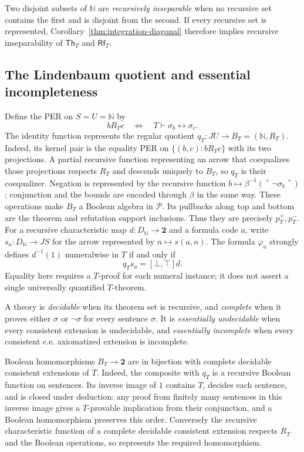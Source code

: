 \documentclass[11pt]{article}
\theoremstyle{definition}
\theoremstyle{remark}
\begin{document}
Two disjoint subsets of $\mathbb N$ are \emph{recursively inseparable}
when no recursive set contains the first and is disjoint from the second.
If every recursive set is represented, Corollary~\ref{thm:integration-diagonal}
therefore implies recursive inseparability of
$\mathsf{Th}_T$ and $\mathsf{Rf}_T$.

\subsection{The Lindenbaum quotient and essential incompleteness}

Define the PER on $S=U=\mathbb N$ by
\[
 bR_Tc\quad\Longleftrightarrow\quad
 T\vdash\sigma_b\leftrightarrow\sigma_c.
\]
The identity function represents the regular quotient
$q_T:JU\to B_T=(\mathbb N,R_T)$.
Indeed, its kernel pair is the equality PER on
$\{(b,c):bR_Tc\}$ with its two projections. A partial recursive function representing an arrow that coequalizes
those projections respects $R_T$ and descends uniquely to $B_T$,
so $q_T$ is their coequalizer. Negation is represented by the
recursive function $b\mapsto\beta^{-1}(\ulcorner\neg\sigma_b\urcorner)$;
conjunction and the bounds are encoded through $\beta$ in the same way.
These operations make $B_T$ a Boolean algebra in $\mathcal P$. Its pullbacks along
top and bottom are the theorem and refutation support inclusions.
Thus they are precisely $p_T^+,p_T^-$.
For a recursive characteristic map $d:D_{\mathbb N}\to\mathbf2$
and a formula code $a$, write $s_a:D_{\mathbb N}\to JS$ for the
arrow represented by $n\mapsto s(a,n)$.
The formula $\varphi_a$ strongly defines $d^{-1}(1)$ numeralwise
in $T$ if and only if
\[
 q_Ts_a=[\bot,\top]d.
\]
Equality here requires a $T$-proof for each numeral instance; it
does not assert a single universally quantified $T$-theorem.

A theory is \emph{decidable} when its theorem set is recursive,
and \emph{complete} when it proves either $\sigma$ or $\neg\sigma$
for every sentence $\sigma$. It is \emph{essentially undecidable}
when every consistent extension is undecidable, and
\emph{essentially incomplete} when every consistent c.e. axiomatized
extension is incomplete.

Boolean homomorphisms $B_T\to\mathbf2$ are in bijection with
complete decidable consistent extensions of $T$. Indeed, the
composite with $q_T$ is a recursive Boolean function on
sentences. Its inverse image of $1$ contains $T$, decides each sentence,
and is closed under deduction: any proof from finitely many
sentences in this inverse image gives a $T$-provable implication from their
conjunction, and a Boolean homomorphism preserves this order.
Conversely the recursive characteristic function of a complete
decidable consistent extension respects $R_T$ and the Boolean
operations, so represents the required homomorphism.
\end{document}
